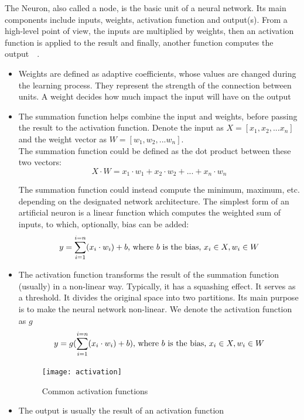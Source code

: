 The Neuron, also called a node, is the basic unit of a neural network. Its main components include inputs,
weights, activation function and output(s). From a high-level point of view, the inputs are multiplied by 
weights, then an activation function is applied to the result and finally, another function computes the output~\cite{REF:12}~\cite{REF:13}. \par


\begin{itemize}
	\item Weights are defined as adaptive coefficients, whose values are changed during the learning process. They represent the strength of the connection between units. A weight decides how much impact the input will have on the output
	
	\item The summation function helps combine the input and weights, before passing the result to the activation function. Denote the input as $X = [x_1, x_2, ...x_n]$ and the weight vector as $W = [w_1, w_2, ...w_n]$.\\
	The summation function could be defined as the dot product between these two vectors:\\
	\begin{equation}
	X \cdot W =x_1 \cdot w_1 +x_2 \cdot w_2 +...+x_n \cdot w_n
	\end{equation}

	
	The summation function could instead compute the minimum, maximum, etc. depending on the designated network architecture. The simplest form of an artificial neuron is a linear function which computes the weighted sum of inputs, to which, optionally, bias can be added:
	\begin{equation}
		y = \sum_{i=1}^{i=n}(x_i \cdot w_i) + b \textnormal{, where $b$ is the bias, $x_i \in X, w_i \in W$}
	\end{equation}

	
	\item The activation function transforms the result of the summation function (usually) in a non-linear way. Typically, it has a squashing effect. It serves as a threshold. It divides the original space into two partitions. Its main purpose is to make the neural network non-linear. We denote the activation function as $g$
	\begin{equation}
		y = g(\sum_{i=1}^{i=n}(x_i \cdot w_i) + b) \textnormal{, where $b$ is the bias, $x_i \in X, w_i \in W$}
	\end{equation}

	
	\begin{figure}[h]
		\caption[Common activation functions]{Common activation functions~\cite{activation_fig} }
		\centering
		\texttt{[image: activation]}
	\end{figure}
	\item The output is usually the result of an activation function
	
\end{itemize}

